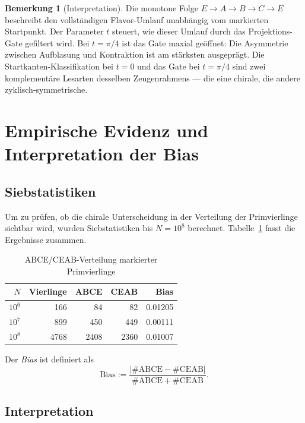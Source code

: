 \documentclass[11pt,a4paper]{article}
\theoremstyle{definition}
\newtheorem{bemerkung}[definition]{Bemerkung}
\theoremstyle{plain}
\begin{document}
	\begin{bemerkung}[Interpretation]
		Die monotone Folge $E\!\to\!A\!\to\!B\!\to\!C\!\to\!E$ beschreibt den vollständigen Flavor-Umlauf unabhängig vom markierten Startpunkt. Der Parameter $t$ steuert, wie dieser Umlauf durch das Projektions-Gate gefiltert wird. Bei $t=\pi/4$ ist das Gate maxial geöffnet: Die Asymmetrie zwischen Aufblasung und Kontraktion ist am stärksten ausgeprägt. Die Startkanten-Klassifikation bei $t=0$ und das Gate bei $t=\pi/4$ sind zwei komplementäre Lesarten desselben Zeugenrahmens --- die eine chirale, die andere zyklisch-symmetrische.
	\end{bemerkung}
	
	\section{Empirische Evidenz und Interpretation der Bias}
	
	\subsection{Siebstatistiken}
	
	Um zu prüfen, ob die chirale Unterscheidung in der Verteilung der Primvierlinge sichtbar wird, wurden Siebstatistiken bis $N=10^8$ berechnet. Tabelle~\ref{tab:sieve} fasst die Ergebnisse zusammen.
	
	\begin{table}[htbp]
		\centering
		\caption{ABCE/CEAB-Verteilung markierter Primvierlinge}
		\label{tab:sieve}
		\begin{tabular}{@{}rrrrr@{}}
			\toprule
			$N$ & Vierlinge & ABCE & CEAB & Bias \\
			\midrule
			$10^6$  & 166  & 84  & 82  & 0.01205 \\
			$10^7$  & 899  & 450 & 449 & 0.00111 \\
			$10^8$  & 4768 & 2408 & 2360 & 0.01007 \\
			\bottomrule
		\end{tabular}
	\end{table}
	
	Der \emph{Bias} ist definiert als
	\[
	\mathrm{Bias}:=\frac{|\#\mathrm{ABCE}-\#\mathrm{CEAB}|}{\#\mathrm{ABCE}+\#\mathrm{CEAB}}.
	\]
	
	\subsection{Interpretation}
	
\end{document}
